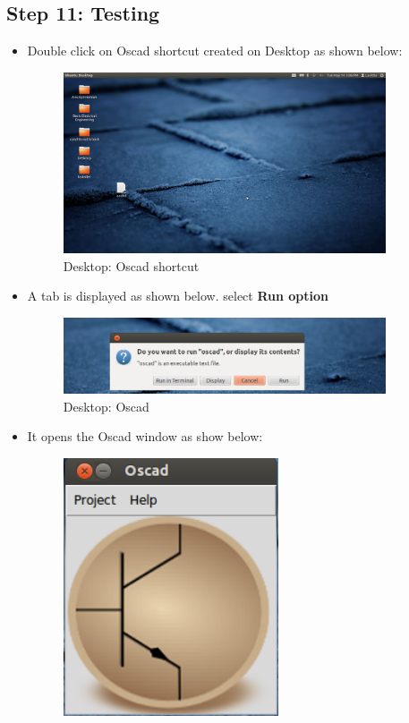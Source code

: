 \subsection {Step 11: Testing}
\begin{itemize}
\item Double click on Oscad shortcut created on Desktop as shown below:
\begin{figure}[h]
\centering
\includegraphics[width=0.9\textwidth]{figures/screenshot1.png}
\caption{Desktop: Oscad shortcut}
\label{Terminal: Oscad shortcut}
\end{figure}
\newpage
\item A tab is displayed as shown below. select \textbf{Run option}
\begin{figure}[h]
\centering
\includegraphics[width=0.9\textwidth]{figures/run.png}
\caption{Desktop: Oscad }
\label{Terminal: Oscad}
\end{figure}
\item It opens the Oscad window as show below:
\begin{figure}[h]
\centering
\includegraphics[width=0.6\textwidth]{figures/oscadicon.png}

\end{figure}
\end{itemize}
